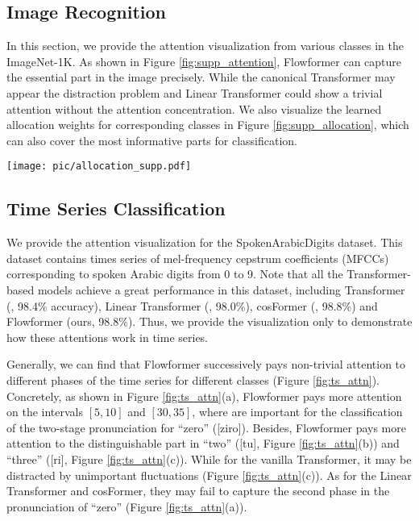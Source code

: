 \documentclass[nohyperref]{article}
\theoremstyle{plain}
\theoremstyle{definition}
\theoremstyle{remark}
\begin{document}
\subsection{Image Recognition}
In this section, we provide the attention visualization from various classes in the ImageNet-1K. As shown in Figure \ref{fig:supp_attention}, Flowformer can capture the essential part in the image precisely. While the canonical Transformer \cite{NIPS2017_3f5ee243} may appear the distraction problem and Linear Transformer \cite{Katharopoulos2020TransformersAR} could show a trivial attention without the attention concentration. We also visualize the learned allocation weights for corresponding classes in Figure \ref{fig:supp_allocation}, which can also cover the most informative parts for classification.
\begin{figure*}[h]
\begin{center}
	\centerline{\texttt{[image: pic/allocation\_supp.pdf]}}
	\vspace{-5pt}
	\caption{Visualization of learned allocation weights $\operatorname{Sigmoid}(\widehat{\mathbf{I}})$ of Flowformer. }
	\label{fig:supp_allocation}
\end{center}
\vspace{-25pt}
\end{figure*}

\subsection{Time Series Classification}\label{appdix:ts_vis}

We provide the attention visualization for the SpokenArabicDigits dataset. This dataset contains times series of mel-frequency cepstrum coefficients (MFCCs) corresponding to spoken Arabic digits from 0 to 9. Note that all the Transformer-based models achieve a great performance in this dataset, including Transformer (\citealt{NIPS2017_3f5ee243}, 98.4\% accuracy), Linear Transformer (\citealt{Katharopoulos2020TransformersAR}, 98.0\%), cosFormer (\citealt{anonymous2022cosformer}, 98.8\%) and Flowformer (ours, 98.8\%). Thus, we provide the visualization only to demonstrate how these attentions work in time series.

Generally, we can find that Flowformer successively pays non-trivial attention to different phases of the time series for different classes (Figure \ref{fig:ts_attn}). Concretely, as shown in Figure \ref{fig:ts_attn}(a), Flowformer pays more attention on the intervals $[5,10]$ and $[30,35]$, where are important for the classification of the two-stage pronunciation for ``zero'' ([\textprimstress ziro]). Besides, Flowformer pays more attention to the distinguishable part in ``two'' ([tu\textipa{:}], Figure \ref{fig:ts_attn}(b)) and ``three'' ([ri\textipa{:}], Figure \ref{fig:ts_attn}(c)). While for the vanilla Transformer, it may be distracted by unimportant fluctuations (Figure \ref{fig:ts_attn}(c)). As for the Linear Transformer and cosFormer, they may fail to capture the second phase in the pronunciation of ``zero'' (Figure \ref{fig:ts_attn}(a)).
\end{document}
